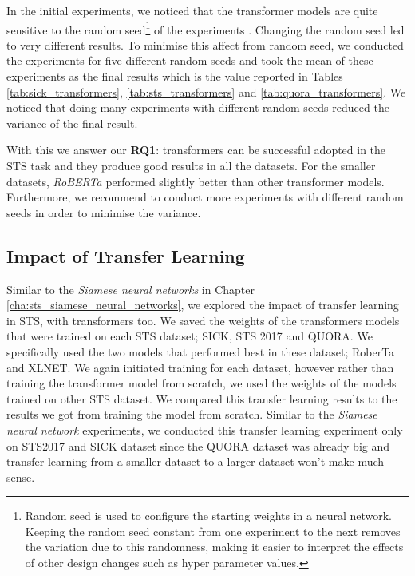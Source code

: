 In the initial experiments, we noticed that the transformer models are quite sensitive to the random seed\footnote{Random seed is used to configure the starting weights in a neural network. Keeping the random seed constant from one experiment to the next removes the variation due to this randomness, making it easier to interpret the effects of other design changes such as hyper parameter values.} of the experiments \autocite{zhang2021revisiting}. Changing the random seed led to very different results. To minimise this affect from random seed, we conducted the experiments for five different random seeds and took the mean of these experiments as the final results which is the value reported in Tables \ref{tab:sick_transformers}, \ref{tab:sts_transformers} and \ref{tab:quora_transformers}. We noticed that doing many experiments with different random seeds reduced the variance of the final result. 

With this we answer our \textbf{RQ1}: transformers can be successful adopted in the STS task and they produce good results in all the datasets. For the smaller datasets, \textit{RoBERTa} performed slightly better than other transformer models. Furthermore, we recommend to conduct more experiments with different random seeds in order to minimise the variance.


\subsection{Impact of Transfer Learning}
\label{sec:transformer_transfer}
Similar to the \textit{Siamese neural networks} in Chapter \ref{cha:sts_siamese_neural_networks}, we explored the impact of transfer learning  in STS, with transformers too. We saved the weights of the transformers models that were trained on each STS dataset; SICK, STS 2017 and QUORA. We specifically used the two models that performed best in these dataset; RoberTa and XLNET. We again initiated training for each dataset, however rather than training the transformer model from scratch, we used the weights of the models trained on other STS dataset. We compared this transfer learning results to the results we got from training the model from scratch. Similar to the \textit{Siamese neural network} experiments, we conducted this transfer learning experiment only on STS2017 and SICK dataset since the QUORA dataset was already big and transfer learning from a smaller dataset to a larger dataset won't make much sense.


